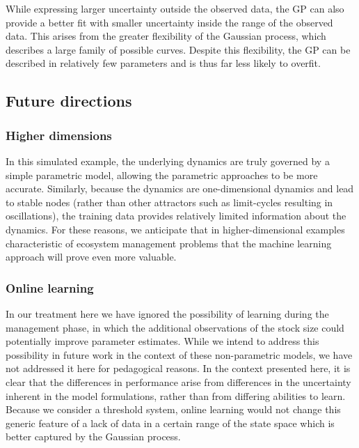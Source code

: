 \documentclass[author-year, review]{elsarticle} %
\begin{document}
While expressing larger uncertainty outside the observed data, the GP
can also provide a better fit with smaller uncertainty inside the range
of the observed data. This arises from the greater flexibility of the
Gaussian process, which describes a large family of possible curves.
Despite this flexibility, the GP can be described in relatively few
parameters and is thus far less likely to overfit.

\subsection{Future directions}\label{future-directions}

\subsubsection{Higher dimensions}\label{higher-dimensions}

In this simulated example, the underlying dynamics are truly governed by
a simple parametric model, allowing the parametric approaches to be more
accurate. Similarly, because the dynamics are one-dimensional dynamics
and lead to stable nodes (rather than other attractors such as
limit-cycles resulting in oscillations), the training data provides
relatively limited information about the dynamics. For these reasons, we
anticipate that in higher-dimensional examples characteristic of
ecosystem management problems that the machine learning approach will
prove even more valuable.

\subsubsection{Online learning}\label{online-learning}

In our treatment here we have ignored the possibility of learning during
the management phase, in which the additional observations of the stock
size could potentially improve parameter estimates. While we intend to
address this possibility in future work in the context of these
non-parametric models, we have not addressed it here for pedagogical
reasons. In the context presented here, it is clear that the differences
in performance arise from differences in the uncertainty inherent in the
model formulations, rather than from differing abilities to learn.
Because we consider a threshold system, online learning would not change
this generic feature of a lack of data in a certain range of the state
space which is better captured by the Gaussian process.
\end{document}
